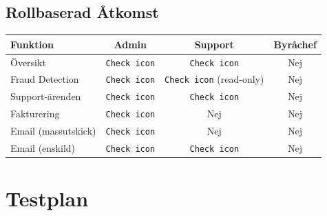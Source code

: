 \documentclass[12pt,a4paper]{article}
\begin{document}
\subsection{Rollbaserad Åtkomst}
\begin{table}[h]
\centering
\begin{tabular}{|l|c|c|c|}
\hline
\textbf{Funktion} & \textbf{Admin} & \textbf{Support} & \textbf{Byråchef} \\
\hline
Översikt & \texttt{Check icon} & \texttt{Check icon} & Nej \\
Fraud Detection & \texttt{Check icon} & \texttt{Check icon} (read-only) & Nej \\
Support-ärenden & \texttt{Check icon} & \texttt{Check icon} & Nej \\
Fakturering & \texttt{Check icon} & Nej & Nej \\
Email (massutskick) & \texttt{Check icon} & Nej & Nej \\
Email (enskild) & \texttt{Check icon} & \texttt{Check icon} & Nej \\
\hline
\end{tabular}
\end{table}

\section{Testplan}
\end{document}
